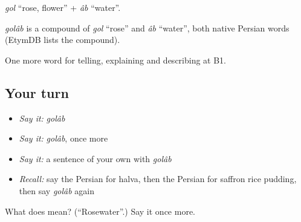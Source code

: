 \emph{gol} \textquotedblleft{}rose, flower\textquotedblright{} + \emph{âb} \textquotedblleft{}water\textquotedblright{}.

\begin{cousinweb}
\emph{golâb} is a compound of \emph{gol} \textquotedblleft{}rose\textquotedblright{} and \emph{âb} \textquotedblleft{}water\textquotedblright{}, both native Persian words (EtymDB lists the compound).
\end{cousinweb}

\begin{grammarlens}[title={What you've built}]
One more word for telling, explaining and describing at B1.
\end{grammarlens}

\subsection*{Your turn}
\begin{itemize}
\raggedright
  \item \emph{Say it:} \emph{golâb}
  \item \emph{Say it:} \emph{golâb}, once more
  \item \emph{Say it:} a sentence of your own with \emph{golâb}
  \item \emph{Recall:} say the Persian for halva, then the Persian for saffron rice pudding, then say \emph{golâb} again
\end{itemize}

\begin{tcolorbox}[breakable,colback=teal!4,colframe=teal!35!black,title={Before you move on}]
What does  mean? (\textquotedblleft{}Rosewater\textquotedblright{}.) Say it once more.
\end{tcolorbox}
